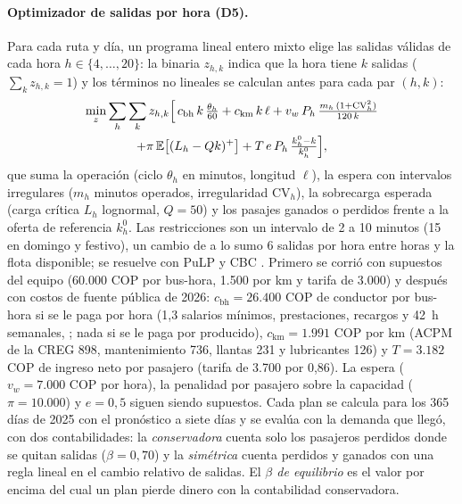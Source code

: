\paragraph{Optimizador de salidas por hora (D5).}
Para cada ruta y día, un programa lineal entero mixto elige las salidas válidas de cada hora $h \in \{4,\dots,20\}$:
la binaria $z_{h,k}$ indica que la hora tiene $k$ salidas ($\sum_k z_{h,k} = 1$) y los términos no lineales se calculan
antes para cada par $(h,k)$:
\begin{multline}
  \min_{z} \sum_{h}\sum_{k} z_{h,k} \Big[\, c_{\mathrm{bh}}\, k\, \tfrac{\theta_h}{60} + c_{\mathrm{km}}\, k\, \ell
  + v_w\, P_h\, \tfrac{m_h\,(1 + \mathrm{CV}_h^2)}{120\, k} \\
  + \pi\, \mathbb{E}\big[(L_h - Q k)^{+}\big] + T\, e\, P_h\, \tfrac{k^0_h - k}{k^0_h} \Big],
  \label{eq:milp}
\end{multline}
que suma la operación (ciclo $\theta_h$ en minutos, longitud $\ell$), la espera con intervalos irregulares ($m_h$
minutos operados, irregularidad $\mathrm{CV}_h$), la sobrecarga esperada (carga crítica $L_h$ lognormal, $Q = 50$) y los
pasajes ganados o perdidos frente a la oferta de referencia $k^0_h$. Las restricciones son un intervalo de 2 a 10
minutos (15 en domingo y festivo), un cambio de a lo sumo 6 salidas por hora entre horas y la flota disponible; se
resuelve con PuLP y CBC \citep{mitchell2011pulp}. Primero se corrió con supuestos del equipo (60.000 COP por bus-hora,
1.500 por km y tarifa de 3.000) y después con costos de fuente pública de 2026: $c_{\mathrm{bh}} = 26.400$ COP de
conductor por bus-hora si se le paga por hora (1,3 salarios mínimos, prestaciones, recargos y 42~h semanales,
\citealp{ley2101}; nada si se le paga por producido), $c_{\mathrm{km}} = 1.991$ COP por km (ACPM de la CREG 898,
mantenimiento 736, llantas 231 y lubricantes 126) y $T = 3.182$ COP de ingreso neto por pasajero (tarifa de 3.700 por
0,86). La espera ($v_w = 7.000$ COP por hora), la penalidad por pasajero sobre la capacidad ($\pi = 10.000$) y
$e = 0{,}5$ siguen siendo supuestos. Cada plan se calcula para los 365 días de 2025 con el pronóstico a siete días y se
evalúa con la demanda que llegó, con dos contabilidades: la \emph{conservadora} cuenta solo los pasajeros perdidos donde
se quitan salidas ($\beta = 0{,}70$) y la \emph{simétrica} cuenta perdidos y ganados con una regla lineal en el cambio relativo de salidas. El \emph{$\beta$
de equilibrio} es el valor por encima del cual un plan pierde dinero con la contabilidad conservadora.


